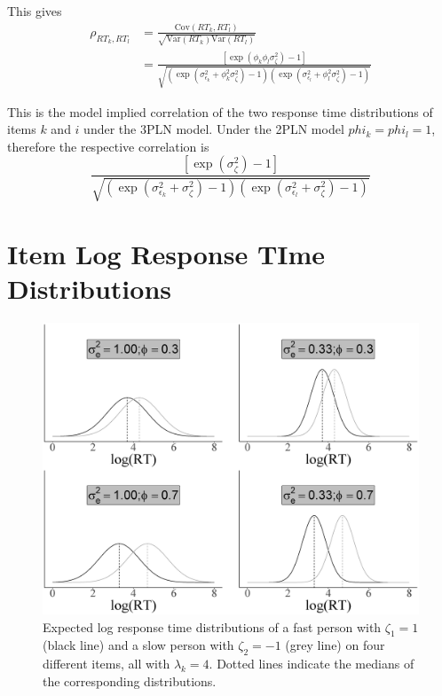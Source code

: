 \documentclass[a4paper,man,apacite,donotrepeattitle]{apa6}
\newcommand{\Var}{\mathrm{Var}}
\newcommand{\Cov}{\mathrm{Cov}}
\begin{document}
This gives
\begin{equation}
\begin{split}
\rho_{RT_k, RT_l} & = \frac{\Cov(RT_k, RT_l)}{\sqrt{\Var(RT_k) \Var(RT_l)}} \\
                  & = \frac{\left[ \exp \left( \phi_{k}\phi_{l} \sigma^2_{\zeta} \right) -1 \right]}{\sqrt{\left( \exp(\sigma^2_{\epsilon_{k}} + \phi^2_{k} \sigma^2_{\zeta}) - 1 \right)  \left( \exp(\sigma^2_{\epsilon_{l}} + \phi^2_{l} \sigma^2_{\zeta}) - 1 \right)}}
\end{split}
\end{equation}

This is the model implied correlation of the two response time distributions of items $k$ and $i$ under the 3PLN model. Under the 2PLN model $phi_k = phi_l = 1$, therefore the respective correlation is
\begin{equation}
\frac{\left[ \exp \left( \sigma^2_{\zeta} \right) -1 \right]}{\sqrt{\left( \exp(\sigma^2_{\epsilon_{k}} + \sigma^2_{\zeta}) - 1 \right)  \left( \exp(\sigma^2_{\epsilon_{l}} +  \sigma^2_{\zeta}) - 1 \right)}}
\end{equation}


\section{Item Log Response TIme Distributions}
\begin{figure}
	\begin{center}
	 \includegraphics[height = 0.40\textheight]{discrimination_comp_logRT.eps}
	\end{center}		
	 \caption{Expected log response time distributions of a fast person with $\zeta_1 = 1$ (black line) and a slow person with $\zeta_2 = -1$ (grey line) on four different items, all with $\lambda_k = 4$. Dotted lines indicate the medians of the corresponding distributions.} 
	 \label{fig:discr_diff}
\end{figure}
\end{document}
